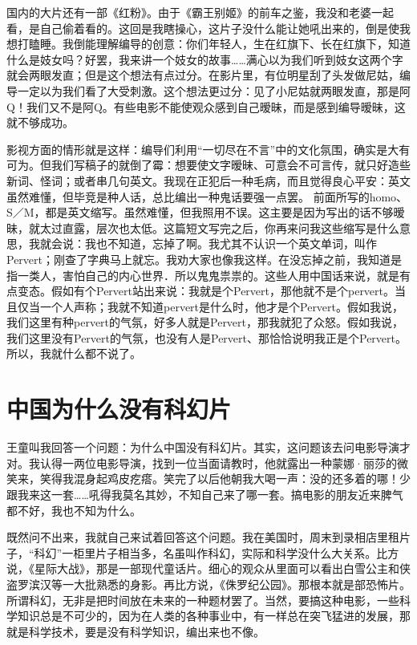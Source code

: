 国内的大片还有一部《红粉》。由于《霸王别姬》的前车之鉴，我没和老婆一起看，是自己偷着看的。这回是我瞎操心，这片子没什么能让她吼出来的，倒是使我想打瞌睡。我倒能理解编导的创意：你们年轻人，生在红旗下、长在红旗下，知道什么是妓女吗？好罢，我来讲一个妓女的故事……满心以为我们听到妓女这两个字就会两眼发直；但是这个想法有点过分。在影片里，有位明星刮了头发做尼姑，编导一定以为我们看了大受刺激。这个想法更过分：见了小尼姑就两眼发直，那是阿Q！我们又不是阿Q。有些电影不能使观众感到自己暧昧，而是感到编导暧昧，这就不够成功。 

影视方面的情形就是这样：编导们利用“一切尽在不言”中的文化氛围，确实是大有可为。但我们写稿子的就倒了霉：想要使文字暧昧、可意会不可言传，就只好造些新词、怪词；或者串几句英文。我现在正犯后一种毛病，而且觉得良心平安：英文虽然难懂，但毕竞是种人话，总比编出一种鬼话要强一点罢。 前面所写的homo、S／M，都是英文缩写。虽然难懂，但我照用不误。这主要是因为写出的话不够暧昧，就太过直露，层次也太低。这篇短文写完之后，你再来问我这些缩写是什么意思，我就会说：我也不知道，忘掉了啊。我尤其不认识一个英文单词，叫作Pervert；刚查了字典马上就忘。我劝大家也像我这样。在没忘掉之前，我知道是指一类人，害怕自己的内心世界．所以鬼鬼祟祟的。这些人用中国话来说，就是有点变态。假如有个Pervert站出来说：我就是个Pervert，那他就不是个pervert。当且仅当一个人声称；我就不知道pervert是什么时，他才是个Pervert。假如我说，我们这里有种pervert的气氛，好多人就是Pervert，那我就犯了众怒。假如我说，我们这里没有Pervert的气氛，也没有人是Pervert、那恰恰说明我正是个Pervert。所以，我就什么都不说了。
 
\chapter{中国为什么没有科幻片}

王童叫我回答一个问题：为什么中国没有科幻片。其实，这问题该去问电影导演才对。我认得一两位电影导演，找到一位当面请教时，他就露出一种蒙娜·丽莎的微笑来，笑得我混身起鸡皮疙瘩。笑完了以后他朝我大喝一声：没的还多着的哪！少跟我来这一套……吼得我莫名其妙，不知自己来了哪一套。搞电影的朋友近来脾气都不好，我也不知为什么。 

既然问不出来，我就自己来试着回答这个问题。我在美国时，周末到录相店里租片子，“科幻”一柜里片子相当多，名虽叫作科幻，实际和科学没什么大关系。比方说，《星际大战》，那是一部现代童话片。细心的观众从里面可以看出白雪公主和侠盗罗滨汉等一大批熟悉的身影。再比方说，《侏罗纪公园》。那根本就是部恐怖片。所谓科幻，无非是把时间放在未来的一种题材罢了。当然，要搞这种电影，一些科学知识总是不可少的，因为在人类的各种事业中，有一样总在突飞猛进的发展，那就是科学技术，要是没有科学知识，编出来也不像。 

